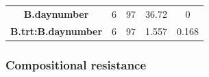 \documentclass[]{article}
\begin{document}
\begin{longtable}[]{@{}ccccc@{}}
\begin{minipage}[t]{0.29\columnwidth}
\textbf{B.daynumber}\strut
\end{minipage} & \begin{minipage}[t]{0.10\columnwidth}\centering\strut
6\strut
\end{minipage} & \begin{minipage}[t]{0.10\columnwidth}\centering\strut
97\strut
\end{minipage} & \begin{minipage}[t]{0.12\columnwidth}\centering\strut
36.72\strut
\end{minipage} & \begin{minipage}[t]{0.12\columnwidth}\centering\strut
0\strut
\end{minipage}\tabularnewline
\begin{minipage}[t]{0.29\columnwidth}\centering\strut
\textbf{B.trt:B.daynumber}\strut
\end{minipage} & \begin{minipage}[t]{0.10\columnwidth}\centering\strut
6\strut
\end{minipage} & \begin{minipage}[t]{0.10\columnwidth}\centering\strut
97\strut
\end{minipage} & \begin{minipage}[t]{0.12\columnwidth}\centering\strut
1.557\strut
\end{minipage} & \begin{minipage}[t]{0.12\columnwidth}\centering\strut
0.168\strut
\end{minipage}\tabularnewline
\bottomrule
\end{longtable}

\newpage

\subsubsection{Compositional resistance}\label{compositional-resistance}
\end{document}
